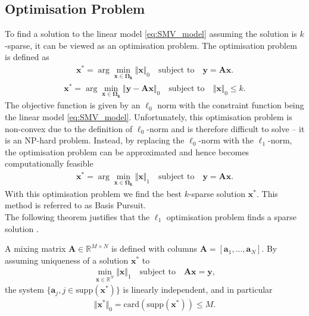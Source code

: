 \subsection{Optimisation Problem}\label{sec:opti}
To find a solution to the linear model \eqref{eq:SMV_model} assuming the solution is $k$-sparse, it can be viewed as an optimisation problem. 
The optimisation problem is defined as
\begin{align*}
\mathbf{x}^\ast = \arg \min_{\mathbf{x} \in \boldsymbol{\Omega_{k}}} \Vert \mathbf{x} \Vert_0 \quad \text{subject to} \quad \mathbf{y} = \mathbf{Ax}.
\end{align*}
\begin{align*}
\mathbf{x}^\ast = \arg \min_{\mathbf{x} \in \boldsymbol{\Omega_{k}}} \Vert \mathbf{y} - \mathbf{Ax} \Vert_0 \quad \text{subject to} \quad \Vert \mathbf{x} \Vert_0 \leq k.
\end{align*}
The objective function is given by an $\ell_0$ norm with the constraint function being the linear model \eqref{eq:SMV_model}. 
Unfortunately, this optimisation problem is non-convex due to the definition of $\ell_0$-norm and is therefore difficult to solve -- it is an NP-hard problem. 
Instead, by replacing the $\ell_0$-norm with the $\ell_1$-norm, the optimisation problem can be approximated and hence becomes computationally feasible \cite[p. 27]{CS}
\begin{align}\label{eq:SMV_p1}
\mathbf{x}^\ast = \arg \min_{\mathbf{x} \in  \boldsymbol{\Omega_{k}}} \Vert \mathbf{x} \Vert_1 \quad \text{subject to} \quad \mathbf{y} = \mathbf{Ax}.
\end{align} 
With this optimisation problem we find the best $k$-sparse solution $\mathbf{x}^\ast$. 
This method is referred to as Basis Pursuit. 
\\
The following theorem justifies that the $\ell_1$ optimisation problem finds a sparse solution \cite[p. 62-63]{FR}.
\begin{theorem}
A mixing matrix $\mathbf{A} \in \mathbb{R}^{M \times N}$ is defined with columns $\mathbf{A} = [\mathbf{a}_1, \dots, \mathbf{a}_N]$. 
By assuming uniqueness of a solution $\mathbf{x}^{\ast}$ to
\begin{align*}
\min_{\mathbf{x} \in \mathbb{R}^N} \Vert \mathbf{x} \Vert_1 \quad \text{subject to} \quad \mathbf{Ax} = \mathbf{y},
\end{align*}
the system $\lbrace \mathbf{a}_j, j \in \text{supp}( \mathbf{x}^\ast) \rbrace$ is linearly independent, and in particular
\begin{align*}
\Vert \mathbf{x}^\ast \Vert_0 = \text{card}(\text{supp} (\mathbf{x}^\ast)) \leq M.
\end{align*}
\end{theorem}
